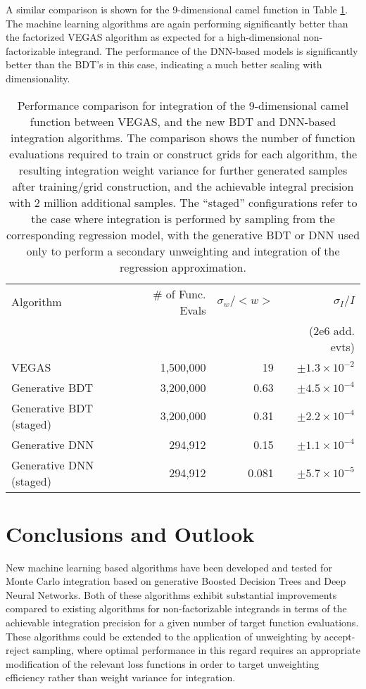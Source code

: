 \documentclass[a4paper,11pt]{article}
\begin{document}
A similar comparison is shown for the 9-dimensional camel function in Table \ref{tab:camel9d}.  The machine learning algorithms are again performing significantly better than the factorized VEGAS algorithm as expected for a high-dimensional non-factorizable integrand.  The performance of the DNN-based models is significantly better than the BDT's in this case, indicating a much better scaling with dimensionality.

\begin{table}[htb!]
\begin{center}
 \begin{tabular}{l|r|r|r}
 Algorithm & \# of Func. Evals & $\sigma_w/<w>$ & $\sigma_{I}/I$ \\
           &                   &                & (2e6 add. evts) \\\hline
 VEGAS & 1,500,000 & 19 & $\pm 1.3\times 10^{-2}$ \\
 Generative BDT  & 3,200,000 & 0.63 & $\pm 4.5\times 10^{-4}$\\
 Generative BDT (staged)  & 3,200,000 & 0.31 & $\pm 2.2\times 10^{-4}$\\
 Generative DNN  & 294,912 & 0.15 & $\pm 1.1\times 10^{-4}$\\
 Generative DNN (staged) & 294,912 & 0.081 & $\pm 5.7\times 10^{-5}$\\
 \end{tabular}
 \caption{Performance comparison for integration of the 9-dimensional camel function between VEGAS, and the new BDT and DNN-based integration algorithms.  The comparison shows the number of function evaluations required to train or construct grids for each algorithm, the resulting integration weight variance for further generated samples after training/grid construction, and the achievable integral precision with 2 million additional samples.  The ``staged'' configurations refer to the case where integration is performed by sampling from the corresponding regression model, with the generative BDT or DNN used only to perform a secondary unweighting and integration of the regression approximation.}
 \label{tab:camel9d}
 \end{center}
\end{table}
 
\section{Conclusions and Outlook}

New machine learning based algorithms have been developed and tested for Monte Carlo integration based on generative Boosted Decision Trees and Deep Neural Networks.  Both of these algorithms exhibit substantial improvements compared to existing algorithms for non-factorizable integrands in terms of the achievable integration precision for a given number of target function evaluations.  These algorithms could be extended to the application of unweighting by accept-reject sampling, where optimal performance in this regard requires an appropriate modification of the relevant loss functions in order to target unweighting efficiency rather than weight variance for integration.
\end{document}
